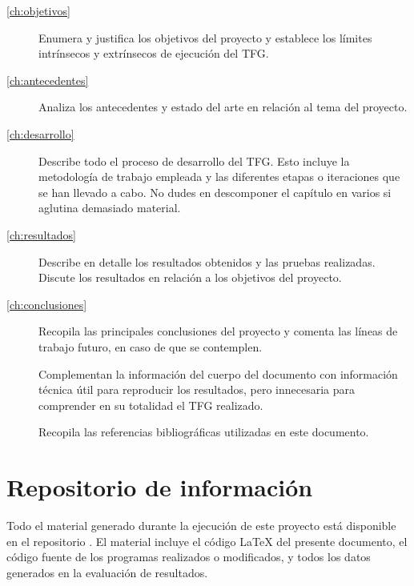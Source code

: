 \begin{description}
    \item[\autoref{ch:objetivos}] Enumera y justifica los objetivos del proyecto y establece los límites intrínsecos y extrínsecos de ejecución del TFG.
    \item[\autoref{ch:antecedentes}] Analiza los antecedentes y estado del arte en relación al tema del proyecto.
    \item[\autoref{ch:desarrollo}] Describe todo el proceso de desarrollo del TFG.  Esto incluye la metodología de trabajo empleada y las diferentes etapas o iteraciones que se han llevado a cabo.  No dudes en descomponer el capítulo en varios si aglutina demasiado material.
    \item[\autoref{ch:resultados}] Describe en detalle los resultados obtenidos y las pruebas realizadas. Discute los resultados en relación a los objetivos del proyecto.
    \item[\autoref{ch:conclusiones}] Recopila las principales conclusiones del proyecto y comenta las líneas de trabajo futuro, en caso de que se contemplen.
    \item[] Complementan la información del cuerpo del documento con información técnica útil para reproducir los resultados, pero innecesaria para comprender en su totalidad el TFG realizado.
    \item[] Recopila las referencias bibliográficas utilizadas en este documento.
\end{description}



\section{Repositorio de información}
\label{sec:repositorio}


Todo el material generado durante la ejecución de este proyecto está disponible en el repositorio \thegitrepo{}.  El material incluye el código \LaTeX{} del presente documento, el código fuente de los programas realizados o modificados, y todos los datos generados en la evaluación de resultados.